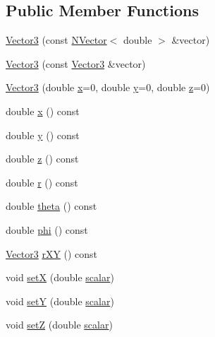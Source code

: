 \subsection*{Public Member Functions}
\begin{DoxyCompactItemize}
\item 
\mbox{\hyperlink{class_vector3_a7f0648c3ba70beccd1b820bf9a55b97e}{Vector3}} (const \mbox{\hyperlink{class_n_vector}{N\+Vector}}$<$ double $>$ \&vector)
\item 
\mbox{\hyperlink{class_vector3_a7d08ef6fb4d8a4f078ed34c60422a9bf}{Vector3}} (const \mbox{\hyperlink{class_vector3}{Vector3}} \&vector)
\item 
\mbox{\hyperlink{class_vector3_a6151fc844ddb2aaa316317b922cb8d22}{Vector3}} (double \mbox{\hyperlink{class_vector3_a58680da7b1109919f9912cc8c5d4d54d}{x}}=0, double \mbox{\hyperlink{class_vector3_aa86961f470134f1c7ca3eec7a88ad069}{y}}=0, double \mbox{\hyperlink{class_vector3_aff9b42255ac1e08c52a5eda5a4513a48}{z}}=0)
\item 
double \mbox{\hyperlink{class_vector3_a58680da7b1109919f9912cc8c5d4d54d}{x}} () const
\item 
double \mbox{\hyperlink{class_vector3_aa86961f470134f1c7ca3eec7a88ad069}{y}} () const
\item 
double \mbox{\hyperlink{class_vector3_aff9b42255ac1e08c52a5eda5a4513a48}{z}} () const
\item 
double \mbox{\hyperlink{class_vector3_acbf6dfc367121fd82a153c4593306145}{r}} () const
\item 
double \mbox{\hyperlink{class_vector3_a30c86ee94c98070b469a56fa4f7fde4f}{theta}} () const
\item 
double \mbox{\hyperlink{class_vector3_af04a3d08dae7f1ba36ee3feaf3bc8a4c}{phi}} () const
\item 
\mbox{\hyperlink{class_vector3}{Vector3}} \mbox{\hyperlink{class_vector3_aaf2a01831ab227b33593145fc21f74d6}{r\+XY}} () const
\item 
void \mbox{\hyperlink{class_vector3_add0f1fd39742bfcc74a0d9fe620e0178}{setX}} (double \mbox{\hyperlink{class_vector3_a9c6df044ff0f0b8e7809d3dbfa84407e}{scalar}})
\item 
void \mbox{\hyperlink{class_vector3_a3197fa0880adc862a01f9bf29dd83e10}{setY}} (double \mbox{\hyperlink{class_vector3_a9c6df044ff0f0b8e7809d3dbfa84407e}{scalar}})
\item 
void \mbox{\hyperlink{class_vector3_a4404619e2da9f0717c2d1b68fa4830f2}{setZ}} (double \mbox{\hyperlink{class_vector3_a9c6df044ff0f0b8e7809d3dbfa84407e}{scalar}})

\end{DoxyCompactItemize}
